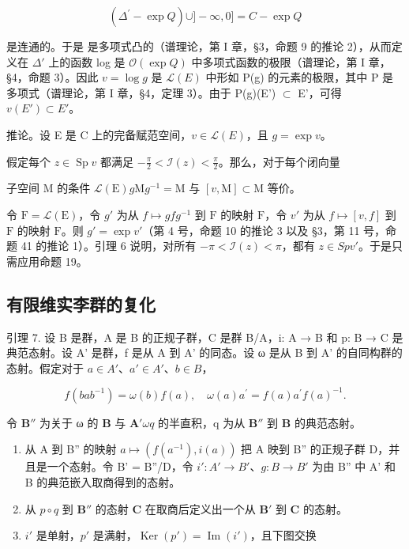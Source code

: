 \[
\left. \left(\Delta^ {\prime} - \exp Q\right) \cup ] - \infty , 0 ] = C - \exp Q \right.
\]

是连通的。于是  是多项式凸的（谱理论，第 I 章，§3，命题 9 的推论 2），从而定义在 \(\Delta'\) 上的函数 log 是 \(\mathcal{O}(\exp Q)\) 中多项式函数的极限（谱理论，第 I 章，§4，命题 3）。因此 \(v = \log g\) 是 \(\mathcal{L}(E)\) 中形如 P(g) 的元素的极限，其中 P 是多项式（谱理论，第 I 章，§4，定理 3）。由于 P(g)(E') \(\subset\) E'，可得 \(v(E') \subset E'\)。

推论。设 E 是 C 上的完备赋范空间，\(v \in \mathcal{L}(E)\)，且 \(g = \exp v\)。

假定每个 \(z \in \operatorname{Sp} v\) 都满足 \(-\frac{\pi}{2} < \mathcal{I}(z) < \frac{\pi}{2}\)。那么，对于每个闭向量

子空间 M 的条件 \(\mathcal{L}(\mathrm{E})\)\(g\mathrm{M}g^{-1} = \mathrm{M}\) 与 \([v, \mathrm{M}] \subset \mathrm{M}\) 等价。

令 \(\mathrm{F} = \mathcal{L}(\mathrm{E})\)，令 \(g'\) 为从 \(f \mapsto gfg^{-1}\) 到 \(\mathrm{F}\) 的映射 \(\mathrm{F}\)，令 \(v'\) 为从 \(f \mapsto [v, f]\) 到 \(\mathrm{F}\) 的映射 \(\mathrm{F}\)。则 \(g' = \exp v'\)（第 4 号，命题 10 的推论 3 以及 §3，第 11 号，命题 41 的推论 1）。引理 6 说明，对所有 \(-\pi < \mathcal{I}(z) < \pi\)，都有 \(z \in Sp v'\)。于是只需应用命题 19。

\subsection{有限维实李群的复化}

引理 7. 设 B 是群，A 是 B 的正规子群，C 是群 B/A，i: A → B 和 p: B → C 是典范态射。设 A' 是群，f 是从 A 到 A' 的同态。设 ω 是从 B 到 A' 的自同构群的态射。假定对于 \(a \in A'\)、\(a' \in A'\)、\(b \in B\)，

\[
f (b a b ^ {- 1}) = \omega (b) f (a), \quad \omega (a) a ^ {\prime} = f (a) a ^ {\prime} f (a) ^ {- 1}.
\]

令 \(\mathbf{B}''\) 为关于 ω 的 \(\mathbf{B}\) 与 \(\mathbf{A}'\)\(\omega\)\(q\) 的半直积，q 为从 \(\mathbf{B}''\) 到 \(\mathbf{B}\) 的典范态射。

\begin{enumerate}
\def\labelenumi{(\roman{enumi})}
\item
  从 A 到 B'' 的映射 \(a \mapsto (f(a^{-1}), i(a))\) 把 A 映到 B'' 的正规子群 D，并且是一个态射。令 B' = B''/D，令 \(i' \colon A' \to B'\)、\(g \colon B \to B'\) 为由 B'' 中 A' 和 B 的典范嵌入取商得到的态射。
\item
  从 \(p \circ q\) 到 \(\mathbf{B}''\) 的态射 \(\mathbf{C}\) 在取商后定义出一个从 \(\mathbf{B}'\) 到 \(\mathbf{C}\) 的态射。
\item
  \(i'\) 是单射，\(p'\) 是满射，\(\operatorname{Ker}(p') = \operatorname{Im}(i')\)，且下图交换
\end{enumerate}

